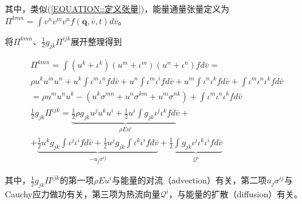 \documentclass[LBMDerivation.tex]{subfiles}
\begin{document}

其中，类似(\ref{EQUATION::定义张量})，能量通量张量定义为$\Pi^{kmn}= \int  v^n v^{m} v^{n} f(\boldsymbol{q}, \bar{v}, t) d \bar{v}$。



将$\Pi^{kmn}$、$\frac{1}{2} g_{jk}\Pi^{i j k}$展开整理得到



\begin{equation}
  \begin{aligned}
    \Pi^{kmn}= \int  (u^k+\iota^k)( u^m + \iota^m )(u^n + \iota^n) f d \bar{v} =                                                       \\  \rho u^k u^m u^n   +  u^k\int \iota^m \iota^n f  d \bar{v} +   u^n \int  \iota^m \iota^{i} f d \bar{v}  +  u^m  \int   \iota^n \iota^{k} f d \bar{v} + \int \iota^m \iota^n  \iota^{k} f  d \bar{v} \\
    = \rho  u^m u^n u^k  - (u^k \sigma^{mn}+u^n \sigma^{km}+u^m \sigma^{nk}) + \int \iota^m \iota^n  \iota^{k} f  d \bar{v}
    \\
    \frac{1}{2} g_{jk}\Pi^{i j k}
    = \underbrace{\frac{1}{2} \rho g_{jk} u^j u^k u^i  + \frac{1}{2} u^i\int g_{jk} \iota^{j} \iota^{k} f  d \bar{v}}_{\rho  E u^i } + \\
    +  \underbrace{\frac{1}{2} u^k g_{jk}  \int   \iota^{j} \iota^{i} f d \bar{v}  + \frac{1}{2} u^j g_{jk}  \int   \iota^{k} \iota^{i} f d \bar{v} }_{ -u_j \sigma^{ij}} +  \underbrace{\frac{1}{2}\int g_{jk} \iota^{j} \iota^{k}  \iota^{i} f  d \bar{v}}_{\mathcal{Q}^i}
  \end{aligned}
  \label{中间过程} ~
\end{equation}


其中，$\frac{1}{2} g_{jk}\Pi^{i j k}$的第一项$\rho  E u^i$与能量的对流（advection）有关，第二项$u_j \sigma^{ij}$与Cauchy应力做功有关，第三项为热流向量$\mathcal{Q}^i$，与能量的扩散（diffusion）有关。



%

\end{document}
